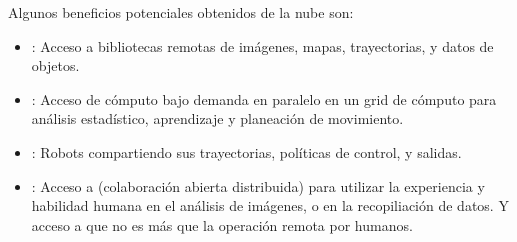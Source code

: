 Algunos beneficios potenciales obtenidos de la nube son:
\begin{itemize}
\item {} 
: Acceso a bibliotecas remotas de imágenes, mapas, trayectorias, y datos de objetos.

\item {} 
: Acceso de cómputo bajo demanda en paralelo en un grid de cómputo para análisis estadístico, aprendizaje y planeación de movimiento.

\item {} 
: Robots compartiendo sus trayectorias, políticas de control, y salidas.

\item {} 
: Acceso a  (colaboración abierta distribuida) para utilizar la experiencia y habilidad humana en el análisis de imágenes, o en la recopiliación de datos. Y acceso a  que no es más que la operación remota por humanos.

\end{itemize}


